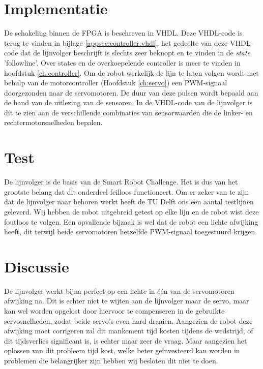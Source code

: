 \documentclass{report}
\begin{document}
\section{Implementatie}
De schakeling binnen de FPGA is beschreven in VHDL.
Deze VHDL-code is terug te vinden in bijlage \ref{appsec:controller.vhdl}, het gedeelte van deze VHDL-code dat de lijnvolger beschrijft is slechts zeer beknopt en te vinden in de \textit{state} 'followline'. 
Over states en de overkoepelende controller is meer te vinden in hoofdstuk \ref{ch:controller}.
Om de robot werkelijk de lijn te laten volgen wordt met behulp van de motorcontroller (Hoofdstuk \ref{ch:servo}) een PWM-signaal doorgezonden naar de servomotoren.
De duur van deze pulsen wordt bepaald aan de hand van de uitlezing van de sensoren.
In de VHDL-code van de lijnvolger is dit te zien aan de verschillende combinaties van sensorwaarden die de linker- en rechtermotorsnelheden bepalen.

\section{Test}
De lijnvolger is de basis van de Smart Robot Challenge.
Het is dus van het grootste belang dat dit onderdeel feilloos functioneert.
Om er zeker van te zijn dat de lijnvolger naar behoren werkt heeft de TU Delft ons een aantal testlijnen geleverd.
Wij hebben de robot uitgebreid getest op elke lijn en de robot wist deze foutloos te volgen.
Een opvallende bijzaak is wel dat de robot een lichte afwijking heeft, dit terwijl beide servomotoren hetzelfde PWM-signaal toegestuurd krijgen.

\section{Discussie}
De lijnvolger werkt bijna perfect op een lichte in één van de servomotoren afwijking na. Dit is echter niet te wijten aan de lijnvolger maar de servo, maar kan wel worden opgelost door hiervoor te compenseren in de gebruikte servosnelheden, zodat beide servo's even hard draaien.
Aangezien de robot deze afwijking moet corrigeren zal dit mankement tijd kosten tijdens de wedstrijd, of dit tijdsverlies significant is, is echter maar zeer de vraag.
Maar aangezien het oplossen van dit probleem tijd kost, welke beter geïnvesteerd kan worden in problemen die belangrijker zijn hebben wij besloten dit niet te doen.
\end{document}
